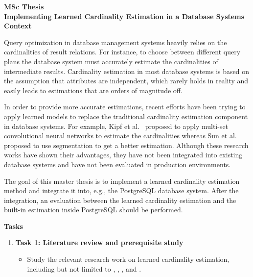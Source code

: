 \documentclass[english]{IFIletter}
\begin{document}
\address{Prof.\ Dr.\ Michael B\"ohlen}
\signature{Prof.\ Dr.\ Michael B\"ohlen\\\position}

\toname{}
\toaddressstreet{}
\toaddresscity{}
\toaddresscountry{}

\begin{letter}

\date{\today}

\opening{\textbf{MSc Thesis \\ Implementing Learned Cardinality
    Estimation in a Database Systems Context}}

\vspace{0.5cm}

Query optimization in database management systems heavily relies on
the cardinalities of result relations.  For instance, to choose
between different query plans the database system must accurately
estimate the cardinalities of intermediate results.  Cardinality
estimation in most database systems is based on the assumption that
attributes are independent, which rarely holds in reality and easily
leads to estimations that are orders of magnitude off.

In order to provide more accurate estimations, recent efforts have
been trying to apply learned models to replace the traditional
cardinality estimation component in database systems.  For example,
Kipf et al.~\cite{DBLP:conf/cidr/KipfKRLBK19} proposed to apply
multi-set convolutional neural networks to estimate the cardinalities
whereas Sun et al.~\cite{DBLP:conf/sigmod/Sun0021} proposed to use
segmentation to get a better estimation.  Although these research
works have shown their advantages, they have not been integrated into
existing database systems and have not been evaluated in production
environments.

The goal of this master thesis is to implement a learned cardinality
estimation method and integrate it into, e.g., the PostgreSQL database
system.  After the integration, an evaluation between the learned
cardinality estimation and the built-in estimation inside PostgreSQL
should be performed.

\textbf{Tasks}

\begin{enumerate}\itemsep=15pt

\item \textbf{Task 1: Literature review and prerequisite study}
  \begin{itemize}
  \item Study the relevant research work on learned cardinality
    estimation, including but not limited to
    \cite{DBLP:conf/edbt/HayekS20}, \cite{DBLP:conf/cidr/KipfKRLBK19},
    \cite{DBLP:conf/sigmod/Sun0021}, and
    \cite{DBLP:journals/pvldb/WangQWWZ21}.
  \end{itemize}


\end{enumerate}
\end{letter}
\end{document}
